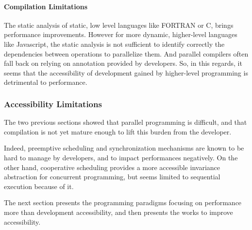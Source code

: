 
\paragraph{Compilation Limitations}

The static analysis of static, low level languages like FORTRAN or C, brings performance improvements.
However for more dynamic, higher-level languages like Javascript, the static analysis is not sufficient to identify correctly the dependencies between operations to parallelize them.
And parallel compilers often fall back on relying on annotation provided by developers.
So, in this regards, it seems that the accessibility of development gained by higher-level programming is detrimental to performance.

\subsubsection{Accessibility Limitations}

The two previous sections showed that parallel programming is difficult, and that compilation is not yet mature enough to lift this burden from the developer. 

Indeed, preemptive scheduling and synchronization mechanisms are known to be hard to manage by developers, and to impact performances negatively.
On the other hand, cooperative scheduling provides a more accessible invariance abstraction for concurrent programming, but seems limited to sequential execution because of it.

The next section presents the programming paradigms focusing on performance more than development accessibility, and then presents the works to improve accessibility.



